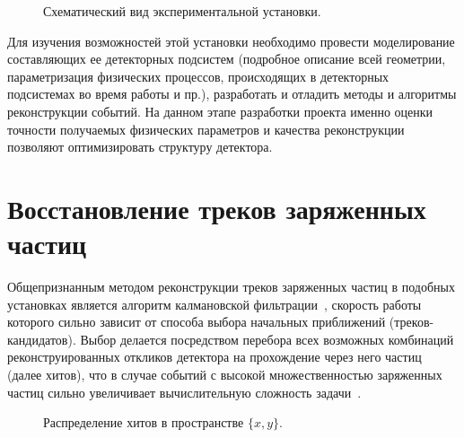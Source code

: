 \documentclass[a4paper, 12pt]{extreport}  %
\begin{document}
\begin{figure}[h!]
\caption{Схематический вид экспериментальной установки.}
\label{img:bmn}
\end{figure}

Для изучения возможностей этой установки необходимо провести моделирование
составляющих ее детекторных подсистем (подробное описание всей геометрии, параметризация
физических процессов, происходящих в детекторных подсистемах во время работы и
пр.), разработать и отладить методы и алгоритмы реконструкции событий. На
данном этапе разработки проекта именно оценки точности получаемых физических
параметров и качества реконструкции позволяют оптимизировать структуру
детектора.  

\section*{Восстановление треков заряженных частиц}

Общепризнанным методом реконструкции треков заряженных частиц в подобных
установках является алгоритм калмановской фильтрации~\cite{kf1, kf2},
скорость работы которого сильно зависит от способа выбора начальных приближений
(треков-кандидатов). Выбор делается посредством перебора всех возможных комбинаций 
реконструированных откликов детектора на прохождение через него частиц (далее хитов), 
что в случае событий с высокой множественностью заряженных частиц сильно увеличивает 
вычислительную сложность задачи~\cite{timur}.

\begin{figure}[h!]
\caption{Распределение хитов в пространстве $\{x, y\}$.}
\label{img:xRyR}
\end{figure}
\end{document}
